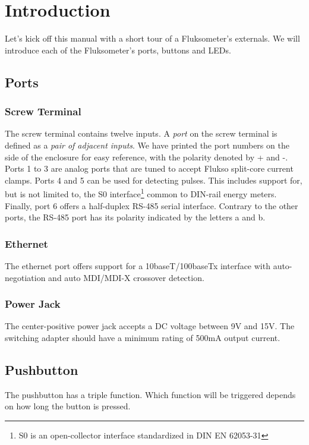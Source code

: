 \chapter{Introduction}

Let's kick off this manual with a short tour of a Fluksometer's externals. We will introduce each of the Fluksometer's ports, buttons and LEDs. 

\section{Ports}

\subsection{Screw Terminal}
\label{sec:introduction_ports_screw}
The screw terminal contains twelve inputs. A \emph{port} on the screw terminal is defined as a \emph{pair of adjacent inputs}. We have printed the port numbers on the side of the enclosure for easy reference, with the polarity denoted by + and -. Ports 1 to 3 are analog ports that are tuned to accept Flukso split-core current clamps. Ports 4 and 5 can be used for detecting pulses. This includes support for, but is not limited to, the S0 interface\footnote{S0 is an open-collector interface standardized in DIN EN 62053-31} common to DIN-rail energy meters. Finally, port 6 offers a half-duplex RS-485 serial interface. Contrary to the other ports, the RS-485 port has its polarity indicated by the letters a and b.

\subsection{Ethernet}
The ethernet port offers support for a 10baseT/100baseTx interface with auto-negotiation and auto MDI/MDI-X crossover detection.

\subsection{Power Jack}
The center-positive power jack accepts a DC voltage between 9V and 15V. The switching adapter should have a minimum rating of 500mA output current.


\section{Pushbutton}
\label{sec:introduction_pushbutton}

The pushbutton has a triple function. Which function will be triggered depends on how long the button is pressed.


